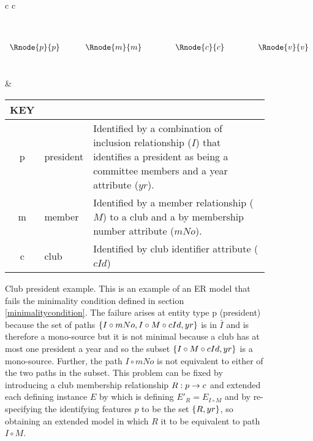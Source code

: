 \begin{figure} [h]
\begin{center}
\begin{tabular}{c c}
$
\begin{array}{cp{0.4cm}cp{0.75cm}cp{0.75cm}c}
              &&               &&                &&               \\[0.25cm]
              &&               &&                &&               \\[0.25cm]
\Rnode{p}{p}	&& \Rnode{m}{m}  &&   \Rnode{c}{c} && \Rnode{v}{v}  \\[0.25cm]
	            &&  
\end{array}
$

\idcomp
{}
\idcomp
{}
\idcomp
{}
\idcomp
{}
\idcomp
& \footnotesize
\begin{tabular}{c p{1.5cm} p{4cm}}
KEY && \\
\hline
p  & president        & Identified by a combination of inclusion relationship ($I$) that identifies a
                       president as being a committee members and a year attribute ($yr$). \\
m  & member           & Identified by a member relationship ($M$) to a club and a by membership 
                         number attribute ($mNo$). \\
c  & club             & Identified by club identifier attribute ($cId$)
\end{tabular} 
\end{tabular}
\end{center}
\caption{Club president example. 
This is an example of an ER model that fails the minimality condition defined in section \ref{minimalitycondition}.
The failure arises at entity type p (president) because 
the set of paths $\left\{I\circ mNo, I \circ M \circ cId, yr\right\}$ is
in $\bar{I}$ and is therefore a mono-source but it is not minimal because
 a club has at most one president a year and so the subset $\left\{I \circ M \circ cId, yr\right\}$ is  a
mono-source. Further, the path $I \circ mNo$ is not equivalent to either of the two paths in the subset.
This problem can be fixed by introducing a club membership relationship $R: p \rightarrow c$ and extended each defining instance $E$
 by which is defining $E'_R=E_{I \circ M}$  and by re-specifying the identifying features $p$ to be the set $\left\{R,yr\right\}$,
so obtaining an extended model in which $R$ it to be equivalent to
path $I \circ M$.
}
\label{clubpresidentbeforenormalisation}
\end{figure}

